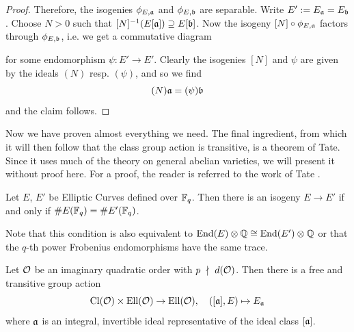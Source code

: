 \begin{proof}
    Therefore, the isogenies $\phi_{E, \mathfrak{a}}$ and $\phi_{E, \mathfrak{b}}$ are separable.
    Write $E' := E_{\mathfrak{a}} = E_{\mathfrak{b}}$.
    Choose $N > 0$ such that $[N]^{-1}(E[\mathfrak{a}]) \supseteq E[\mathfrak{b}]$.
    Now the isogeny $[N] \circ \phi_{E, \mathfrak{a}}$ factors through $\phi_{E, \mathfrak{b}}$, i.e. we get a commutative diagram
    \begin{center}
    \end{center}
    for some endomorphism $\psi: E' \to E'$.
    Clearly the isogenies $[N]$ and $\psi$ are given by the ideals $(N)$ resp. $(\psi)$, and so we find
    \begin{equation*}
        (N)\mathfrak{a} = (\psi)\mathfrak{b}
    \end{equation*}
    and the claim follows.
\end{proof}
Now we have proven almost everything we need.
The final ingredient, from which it will then follow that the class group action is transitive, is a theorem of Tate.
Since it uses much of the theory on general abelian varieties, we will present it without proof here.
For a proof, the reader is referred to the work of Tate \cite{tate}.
\begin{theorem}
    \label{prop:isogeny_theorem}
    Let $E$, $E'$ be Elliptic Curves defined over $\mathbb{F}_q$.
    Then there is an isogeny $E \to E'$ if and only if $\#E(\mathbb{F}_q) = \#E'(\mathbb{F}_q)$.
\end{theorem}
Note that this condition is also equivalent to $\mathrm{End}(E) \otimes \mathbb{Q} \cong \mathrm{End}(E') \otimes \mathbb{Q}$ or that the $q$-th power Frobenius endomorphisms have the same trace. 
\begin{theorem}
    \label{prop:class_group_action}
    Let $\mathcal{O}$ be an imaginary quadratic order with $p \ \nmid \  d(\mathcal{O})$.
    Then there is a free and transitive group action
    \begin{equation*}
        \mathrm{Cl}(\mathcal{O}) \times \mathrm{Ell}(\mathcal{O}) \to \mathrm{Ell}(\mathcal{O}), \quad ([\mathfrak{a}], E) \mapsto E_{\mathfrak{a}}
    \end{equation*}
    where $\mathfrak{a}$ is an integral, invertible ideal representative of the ideal class $[\mathfrak{a}]$.
\end{theorem}
